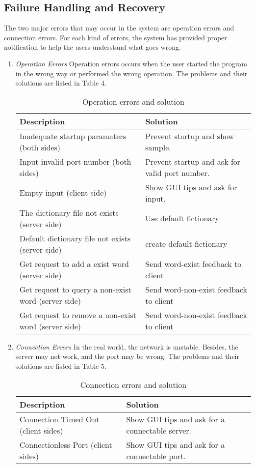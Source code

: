 \documentclass[a4paper]{article}
\begin{document}
\subsection{Failure Handling and Recovery}
The two major errors that may occur in the system are operation errors and connection errors. For each kind of errors, the system has provided proper notification to help the users understand what goes wrong.
\begin{enumerate}
	\item \textit{Operation Errors}
	Operation errors occurs when the user started the program in the wrong way or performed the wrong operation. The problems and their solutions are listed in Table 4.
	\begin{table}[H]
		\caption{Operation errors and solution} 
		\begin{tabular}{|p{5.3cm}|p{6cm}|}
			\hline
			Description & Solution \\ \hline
			Inadequate startup paramaters (both sides) &  Prevent startup and show sample.\\ \hline
			Input invalid port number (both sides) &  Prevent startup and ask for valid port number.\\ \hline
			Empty input (client side) & Show GUI tips and ask for input.\\ \hline
			The dictionary file not exists (server side) &  Use default fictionary \\ \hline
			Default dictionary file not exists (server side) &  create default fictionary \\ \hline
			Get request to add a exist word (server side) & Send word-exist feedback to client \\ \hline
			Get request to query a non-exist word (server side) & Send word-non-exist feedback to client \\ \hline
			Get request to remove a non-exist word (server side) & Send word-non-exist feedback to client \\ \hline
		\end{tabular}
	\end{table}

	\item \textit{Connection Errors}
	In the real world, the network is unstable. Besides, the server may not work, and the port may be wrong. The problems and their solutions are listed in Table 5.

	\begin{table}[H]
		\caption{Connection errors and solution} 
		\begin{tabular}{|p{5.3cm}|p{6cm}|}
			\hline
			Description & Solution \\ \hline
			Connection Timed Out (client sides)& Show GUI tips and ask for a connectable server. \\ \hline
			Connectionless Port (client sides)  &  Show GUI tips and ask for a connectable port.\\ \hline
		\end{tabular}
	\end{table}
\end{enumerate}
\end{document}
